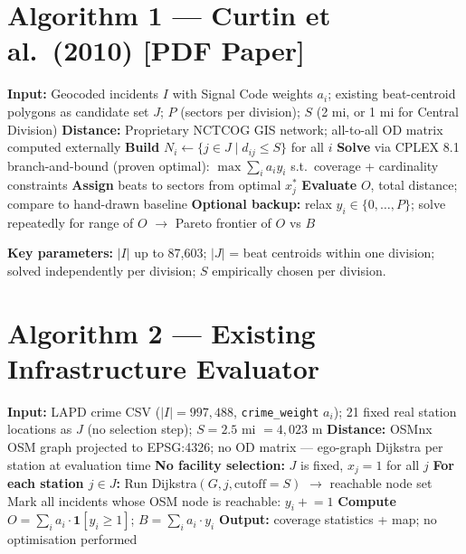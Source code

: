 \documentclass[11pt]{article}
\begin{document}
\section*{Algorithm 1 — Curtin et al.\ (2010) [PDF Paper]}

\begin{algorithm}[H]
\caption{Classical PPAC (Curtin et al., 2010)}
\begin{algorithmic}[1]
\State \textbf{Input:} Geocoded incidents $I$ with Signal Code weights $a_i$;
       {\color{diff}existing beat-centroid polygons} as candidate set $J$;
       $P$ (sectors per division); $S$ (2 mi, or 1 mi for Central Division)
\State \textbf{Distance:} {\color{diff}Proprietary NCTCOG GIS network};
       all-to-all OD matrix computed externally
\State \textbf{Build} $N_i \leftarrow \{j \in J \mid d_{ij} \le S\}$ for all $i$
\State \textbf{Solve} via {\color{diff}CPLEX 8.1 branch-and-bound} (proven optimal):
\Statex \quad $\max \sum_i a_i y_i$ \; s.t.\ coverage + cardinality constraints
\State \textbf{Assign} beats to sectors from optimal $x_j^*$
\State \textbf{Evaluate} $O$, total distance; compare to hand-drawn baseline
\State \textbf{Optional backup:} relax $y_i \in \{0,\dots,P\}$;
       solve repeatedly for range of $O$ $\to$ Pareto frontier of $O$ vs $B$
\end{algorithmic}
\end{algorithm}

\noindent\textbf{Key parameters:} $|I|$ up to 87,603; $|J|$ = beat centroids within one division;
solved independently per division; $S$ empirically chosen per division.

\section*{Algorithm 2 — Existing Infrastructure Evaluator}

\begin{algorithm}[H]
\caption{Existing LAPD Station Coverage Evaluator}
\begin{algorithmic}[1]
\State \textbf{Input:} LAPD crime CSV ($|I|=997{,}488$, \texttt{crime\_weight} $a_i$);
       {\color{diff}21 fixed real station locations} as $J$ (no selection step);
       $S = 2.5$ mi $= 4{,}023$ m
\State \textbf{Distance:} OSMnx OSM graph projected to EPSG:4326;
       {\color{diff}no OD matrix — ego-graph Dijkstra per station at evaluation time}
\State \textbf{No facility selection:} {\color{diff}$J$ is fixed}, $x_j = 1$ for all $j$
\State \textbf{For each station $j \in J$:}
\Statex \quad Run Dijkstra$(G, j, \text{cutoff}=S)$ $\to$ reachable node set
\Statex \quad Mark all incidents whose OSM node is reachable: $y_i \mathrel{+}= 1$
\State \textbf{Compute} $O = \sum_i a_i \cdot \mathbf{1}[y_i \ge 1]$;
       $B = \sum_i a_i \cdot y_i$
\State \textbf{Output:} coverage statistics + map; {\color{diff}no optimisation performed}
\end{algorithmic}
\end{algorithm}
\end{document}
